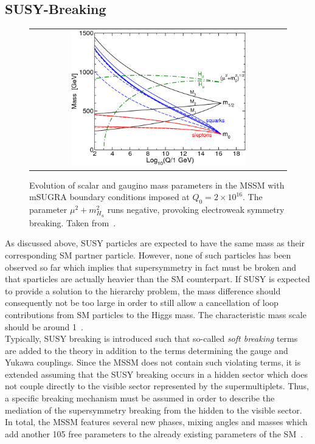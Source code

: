 \subsection{SUSY-Breaking}
\label{subsec:susy_breaking}
\begin{figure}[!tp]
  \centering 
  \begin{tabular}{c}
    \includegraphics[width=0.7\textwidth]{figures/MSSMrun.png}
  \end{tabular}
  \caption{Evolution of scalar and gaugino mass parameters in the MSSM with mSUGRA boundary conditions imposed at $Q_0 = 2 \times 10^{16}$\gev. The parameter $\mu^2 + m^2_{H_{u}}$ runs negative, provoking electroweak symmetry breaking. Taken from~\cite{Martin:1997ns}.}
  \label{fig:MSSMrun}
\end{figure}
As discussed above, SUSY particles are expected to have the same mass as their corresponding SM partner particle. However, none of such particles has been observed so far which implies that supersymmetry in fact must be broken and that sparticles are actually heavier than the SM counterpart. If SUSY is expected to provide a solution to the hierarchy problem, the mass difference should consequently not be too large in order to still allow a cancellation of loop contributions from SM particles to the Higgs mass. The characteristic mass scale should be around 1\tev~\cite{Martin:1997ns}. \\
Typically, SUSY breaking is introduced such that so-called \textit{soft breaking} terms are added to the theory in addition to the terms determining the gauge and Yukawa couplings. Since the MSSM does not contain such violating terms, it is extended assuming that the SUSY breaking occurs in a hidden sector which does not couple directly to the visible sector represented by the supermultiplets. Thus, a specific breaking mechanism must be assumed in order to describe the mediation of the supersymmetry breaking from the hidden to the visible sector. In total, the MSSM features several new phases, mixing angles and masses which add another 105 free parameters to the already existing parameters of the SM~\cite{Dimopoulos:1995ju}.  \\
